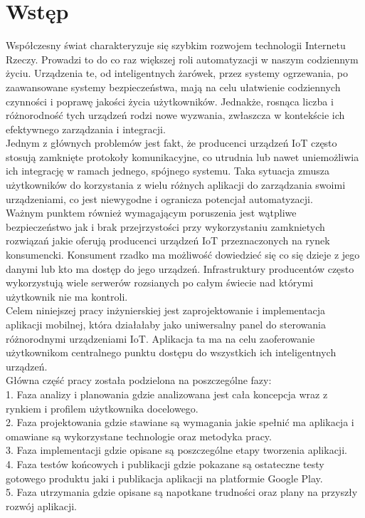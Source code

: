 \section{Wstęp}
Współczesny świat charakteryzuje się szybkim rozwojem technologii Internetu Rzeczy. Prowadzi to do co raz większej roli automatyzacji w naszym codziennym życiu. Urządzenia te, od inteligentnych żarówek, przez systemy ogrzewania, po zaawansowane systemy bezpieczeństwa, mają na celu ułatwienie codziennych czynności i poprawę jakości życia użytkowników. Jednakże, rosnąca liczba i różnorodność tych urządzeń rodzi nowe wyzwania, zwłaszcza w kontekście ich efektywnego zarządzania i integracji.\\

Jednym z głównych problemów jest fakt, że producenci urządzeń IoT często stosują zamknięte protokoły komunikacyjne, co utrudnia lub nawet uniemożliwia ich integrację w ramach jednego, spójnego systemu. Taka sytuacja zmusza użytkowników do korzystania z wielu różnych aplikacji do zarządzania swoimi urządzeniami, co jest niewygodne i ogranicza potencjał automatyzacji.\\

Ważnym punktem również wymagającym poruszenia jest wątpliwe bezpieczeństwo jak i brak przejrzystości przy wykorzystaniu zamknietych rozwiązań jakie oferują producenci urządzeń IoT przeznaczonych na rynek konsumencki. Konsument rzadko ma możliwość dowiedzieć się co się dzieje z jego danymi lub kto ma dostęp do jego urządzeń. Infrastruktury producentów często wykorzystują wiele serwerów rozsianych po całym świecie nad którymi użytkownik nie ma kontroli.\\

Celem niniejszej pracy inżynierskiej jest zaprojektowanie i implementacja aplikacji mobilnej, która działałaby jako uniwersalny panel do sterowania różnorodnymi urządzeniami IoT. Aplikacja ta ma na celu zaoferowanie użytkownikom centralnego punktu dostępu do wszystkich ich inteligentnych urządzeń.\\

Główna część pracy została podzielona na poszczególne fazy:\\

1. Faza analizy i planowania gdzie analizowana jest cała koncepcja wraz z rynkiem i profilem użytkownika docelowego.\\

2. Faza projektowania gdzie stawiane są wymagania jakie spełnić ma aplikacja i omawiane są wykorzystane technologie oraz metodyka pracy.\\

3. Faza implementacji gdzie opisane są poszczególne etapy tworzenia aplikacji.\\

4. Faza testów końcowych i publikacji gdzie pokazane są ostateczne testy gotowego produktu jaki i publikacja aplikacji na platformie Google Play.\\

5. Faza utrzymania gdzie opisane są napotkane trudności oraz plany na przyszły rozwój aplikacji.\\